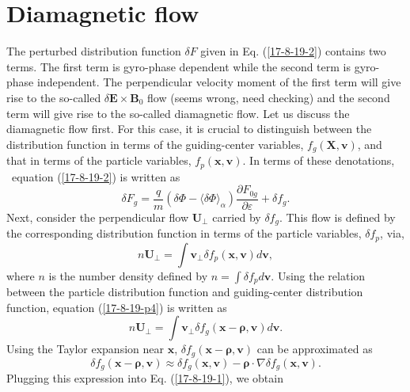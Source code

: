 \documentclass{llncs}
\newcommand{\tmmathbf}[1]{\ensuremath{\boldsymbol{#1}}}
\begin{document}
\section{Diamagnetic flow}\label{17-9-26-1}\label{17-8-19-e1}

The perturbed distribution function $\delta F$ given in Eq. (\ref{17-8-19-2})
contains two terms. The first term is gyro-phase dependent while the second
term is gyro-phase independent. The perpendicular velocity moment of the first
term will give rise to the so-called $\delta \mathbf{E} \times \mathbf{B}_0$
flow (seems wrong, need checking) and the second term will give rise to the
so-called diamagnetic flow. Let us discuss the diamagnetic flow first. For
this case, it is crucial to distinguish between the distribution function in
terms of the guiding-center variables, $f_g (\mathbf{X}, \mathbf{v})$, and
that in terms of the particle variables, $f_p (\mathbf{x}, \mathbf{v})$. In
terms of these denotations, \ equation (\ref{17-8-19-2}) is written as
\begin{equation}
  \delta F_g = \frac{q}{m} (\delta \Phi - \langle \delta \Phi
  \rangle_{\alpha}) \frac{\partial F_{0 g}}{\partial \varepsilon} + \delta f_g
  .
\end{equation}
Next, consider the perpendicular flow $\mathbf{U}_{\perp}$ carried by $\delta
f_g$. This flow is defined by the corresponding distribution function in terms
of the particle variables, $\delta f_p$, via,
\begin{equation}
  \label{17-8-19-p4} n\mathbf{U}_{\perp} = \int \mathbf{v}_{\perp} \delta f_p
  (\mathbf{x}, \mathbf{v}) d\mathbf{v},
\end{equation}
where $n$ is the number density defined by $n = \int \delta f_p d\mathbf{v}$.
Using the relation between the particle distribution function and
guiding-center distribution function, equation (\ref{17-8-19-p4}) is written
as
\begin{equation}
  \label{17-8-19-1} n\mathbf{U}_{\perp} = \int \mathbf{v}_{\perp} \delta f_g
  (\mathbf{x}-\tmmathbf{\rho}, \mathbf{v}) d\mathbf{v}.
\end{equation}
Using the Taylor expansion near $\mathbf{x}$, $\delta f_g
(\mathbf{x}-\tmmathbf{\rho}, \mathbf{v})$ can be approximated as
\begin{equation}
  \delta f_g (\mathbf{x}-\tmmathbf{\rho}, \mathbf{v}) \approx \delta f_g
  (\mathbf{x}, \mathbf{v}) -\tmmathbf{\rho} \cdot \nabla \delta f_g
  (\mathbf{x}, \mathbf{v}) .
\end{equation}
Plugging this expression into Eq. (\ref{17-8-19-1}), we obtain
\end{document}
